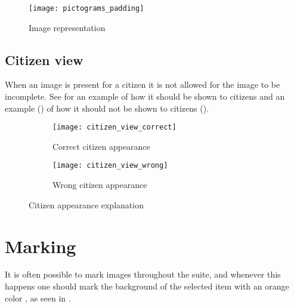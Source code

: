 \begin{figure}[h]
	\centering
	\texttt{[image: pictograms\_padding]}
	\caption{Image representation}
	\label{fig:pictograms_padding}
\end{figure} 
\FloatBarrier

\subsection{Citizen view}
\label{sub:citizen_view}

When an image is present for a citizen it is not allowed for the image to be incomplete. See  for an example of how it should be shown to citizens and an example () of how it should not be shown to citizens (). 

\begin{figure}[!htbp]
    \centering

    \begin{subfigure}[t]{0.4\textwidth}
        \centering
        \texttt{[image: citizen\_view\_correct]}
        \caption{Correct citizen appearance}
        \label{fig:citizen_image_view_correct}
    \end{subfigure}
    \hspace{5em} 
    \begin{subfigure}[t]{0.4\textwidth}
        \centering
        \texttt{[image: citizen\_view\_wrong]}
        \caption{Wrong citizen appearance}
        \label{fig:citizen_image_view_wrong}
    \end{subfigure}
    
    \caption{Citizen appearance explanation}
    \label{fig:citizen_image_view}
\end{figure}

\section{Marking}
\label{sec:marking}
It is often possible to mark images throughout the suite, and whenever this happens one should mark the background of the selected item with an orange color , as seen in . 

